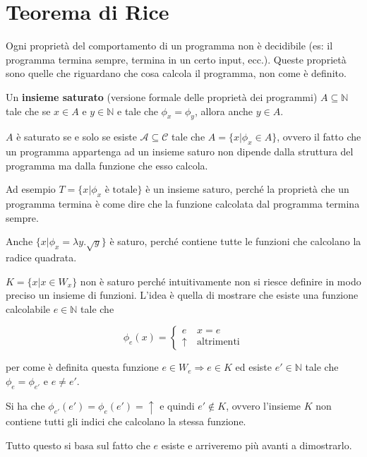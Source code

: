 
\section{Teorema di Rice}

Ogni proprietà del comportamento di un programma non è decidibile (es: il programma termina sempre, termina in un certo input, ecc.).
Queste proprietà sono quelle che riguardano che cosa calcola il programma, non come è definito.

Un \textbf{insieme saturato} (versione formale delle proprietà dei programmi) $ A \subseteq \mathbb{N} $ tale che se $ x \in A $ e $ y \in \mathbb{N} $ e tale che $ \phi_x = \phi_y $, allora anche $ y \in A $.

$ A $ è saturato se e solo se esiste $ \mathcal{A} \subseteq \mathcal{C} $ tale che $ A = \{ x | \phi_x \in A \} $, ovvero il fatto che un programma appartenga ad un insieme saturo non dipende dalla struttura del programma ma dalla funzione che esso calcola.

Ad esempio $ T = \{ x | \phi_x \text{ è totale} \} $ è un insieme saturo, perché la proprietà che un programma termina è come dire che la funzione calcolata dal programma termina sempre.

Anche $ \{ x | \phi_x = \lambda y . \sqrt{y} \} $ è saturo, perché contiene tutte le funzioni che calcolano la radice quadrata.

$ K = \{ x | x \in W_x \} $ non è saturo perché intuitivamente non si riesce definire in modo preciso un insieme di funzioni. L'idea è quella di mostrare che esiste una funzione calcolabile $ e \in \mathbb{N} $ tale che

$$
\phi_e(x) = \begin{cases}
e &\:x=e \\
\uparrow &\:\text{altrimenti}
\end{cases}
$$ 

per come è definita questa funzione $ e \in W_e \Rightarrow e \in K$ ed esiste $ e' \in \mathbb{N} $ tale che $ \phi_e = \phi_{e'} $ e $ e \neq e' $.

Si ha che $\phi_{e'}(e') = \phi_e(e') = \uparrow$ e quindi $ e' \notin K $, ovvero l'insieme $ K $ non contiene tutti gli indici che calcolano la stessa funzione.

Tutto questo si basa sul fatto che $ e $ esiste e arriveremo più avanti a dimostrarlo.

